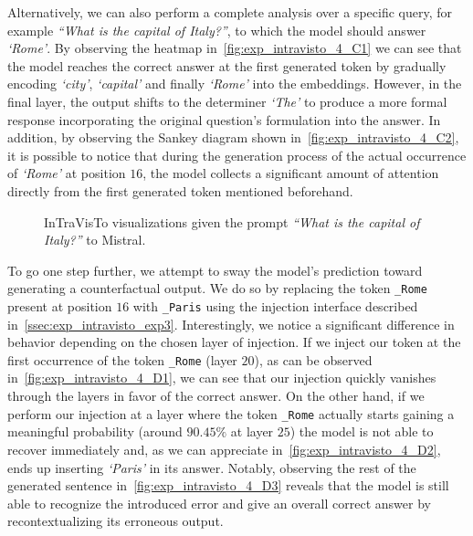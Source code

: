 Alternatively, we can also perform a complete analysis over a specific query, for example \emph{``What is the capital of Italy?''}, to which the model should answer \emph{`Rome'}.
By observing the heatmap in~\cref{fig:exp_intravisto_4_C1} we can see that the model reaches the correct answer at the first generated token by gradually encoding \emph{`city'}, \emph{`capital'} and finally \emph{`Rome'} into the embeddings.
However, in the final layer, the output shifts to the determiner \emph{`The'} to produce a more formal response incorporating the original question's formulation into the answer.
In addition, by observing the Sankey diagram shown in~\cref{fig:exp_intravisto_4_C2}, it is possible to notice that during the generation process of the actual occurrence of \emph{`Rome'} at position $16$, the model collects a significant amount of attention directly from the first generated token mentioned beforehand.

\begin{figure}[tp!]
    \centering
    \quad
    \caption{InTraVisTo visualizations given the prompt \emph{``What is the capital of Italy?''} to Mistral.}
    \label{fig:exp_intravisto_4_C}
\end{figure}

To go one step further, we attempt to sway the model's prediction toward generating a counterfactual output.
We do so by replacing the token \texttt{\_Rome} present at position $16$ with \texttt{\_Paris} using the injection interface described in~\cref{ssec:exp_intravisto_exp3}.
Interestingly, we notice a significant difference in behavior depending on the chosen layer of injection.
If we inject our token at the first occurrence of the token \texttt{\_Rome} (layer $20$), as can be observed in~\cref{fig:exp_intravisto_4_D1}, we can see that our injection quickly vanishes through the layers in favor of the correct answer.
On the other hand, if we perform our injection at a layer where the token \texttt{\_Rome} actually starts gaining a meaningful probability (around $90.45\%$ at layer $25$) the model is not able to recover immediately and, as we can appreciate in~\cref{fig:exp_intravisto_4_D2}, ends up inserting \emph{`Paris'} in its answer.
Notably, observing the rest of the generated sentence in~\cref{fig:exp_intravisto_4_D3} reveals that the model is still able to recognize the introduced error and give an overall correct answer by recontextualizing its erroneous output.

